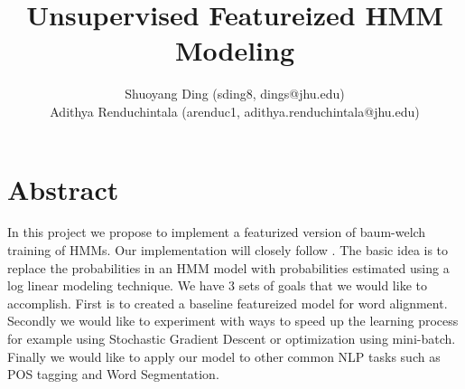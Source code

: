 \documentclass[11pt]{article}
\begin{document}
\title{Unsupervised Featureized HMM Modeling}

\author{Shuoyang Ding (sding8, dings@jhu.edu) \\ Adithya Renduchintala (arenduc1, adithya.renduchintala@jhu.edu)}


\maketitle

\section{Abstract}
In this project we propose to implement a featurized version of baum-welch training of HMMs. Our implementation will closely follow \cite{berg2010painless}. The basic idea is to replace the probabilities in an HMM model with probabilities estimated using a log linear modeling technique. We have 3 sets of goals that we would like to accomplish. First is to created a baseline featureized model for word alignment. Secondly we would like to experiment with ways to speed up the learning process for example using Stochastic Gradient Descent or optimization using mini-batch. Finally we would like to apply our model to other common NLP tasks such as POS tagging and Word Segmentation.
\end{document}
